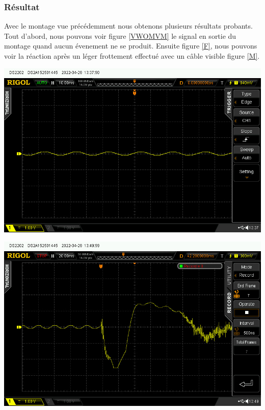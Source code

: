 \documentclass[11pt,french,a4paper]{article}
\begin{document}
\subsubsection{Résultat}
Avec le montage vue précédemment nous obtenons plusieurs résultats probants.
Tout d'abord, nous pouvons voir figure \ref{VWOMVM} le signal en sortie du montage quand aucun évenement ne se produit.
Ensuite figure \ref{F}, nous pouvons voir la réaction après un léger frottement effectué avec un câble visible figure \ref{M}. 

\begin{center}	
\includegraphics[scale=0.5]{../img/plat.jpg}
\label{VWOMVM}
\end{center}

\begin{center}	
\includegraphics[scale=0.5]{../img/frotment.jpg}
\label{F}
\end{center}
\end{document}
